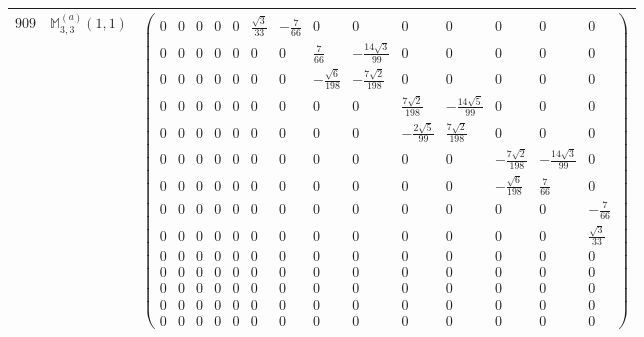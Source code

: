 \documentclass[fleqn,8pt,landscape]{jsarticle}
\begin{document}
\begin{center}
\begin{longtable}{ccc}
$ 909 $ & $ \mathbb{M}_{3,3}^{(a)}(1,1) $ & $ \begin{pmatrix} 0 & 0 & 0 & 0 & 0 & \frac{\sqrt{3}}{33} & - \frac{7}{66} & 0 & 0 & 0 & 0 & 0 & 0 & 0 \\ 0 & 0 & 0 & 0 & 0 & 0 & 0 & \frac{7}{66} & - \frac{14 \sqrt{3}}{99} & 0 & 0 & 0 & 0 & 0 \\ 0 & 0 & 0 & 0 & 0 & 0 & 0 & - \frac{\sqrt{6}}{198} & - \frac{7 \sqrt{2}}{198} & 0 & 0 & 0 & 0 & 0 \\ 0 & 0 & 0 & 0 & 0 & 0 & 0 & 0 & 0 & \frac{7 \sqrt{2}}{198} & - \frac{14 \sqrt{5}}{99} & 0 & 0 & 0 \\ 0 & 0 & 0 & 0 & 0 & 0 & 0 & 0 & 0 & - \frac{2 \sqrt{5}}{99} & \frac{7 \sqrt{2}}{198} & 0 & 0 & 0 \\ 0 & 0 & 0 & 0 & 0 & 0 & 0 & 0 & 0 & 0 & 0 & - \frac{7 \sqrt{2}}{198} & - \frac{14 \sqrt{3}}{99} & 0 \\ 0 & 0 & 0 & 0 & 0 & 0 & 0 & 0 & 0 & 0 & 0 & - \frac{\sqrt{6}}{198} & \frac{7}{66} & 0 \\ 0 & 0 & 0 & 0 & 0 & 0 & 0 & 0 & 0 & 0 & 0 & 0 & 0 & - \frac{7}{66} \\ 0 & 0 & 0 & 0 & 0 & 0 & 0 & 0 & 0 & 0 & 0 & 0 & 0 & \frac{\sqrt{3}}{33} \\ 0 & 0 & 0 & 0 & 0 & 0 & 0 & 0 & 0 & 0 & 0 & 0 & 0 & 0 \\ 0 & 0 & 0 & 0 & 0 & 0 & 0 & 0 & 0 & 0 & 0 & 0 & 0 & 0 \\ 0 & 0 & 0 & 0 & 0 & 0 & 0 & 0 & 0 & 0 & 0 & 0 & 0 & 0 \\ 0 & 0 & 0 & 0 & 0 & 0 & 0 & 0 & 0 & 0 & 0 & 0 & 0 & 0 \\ 0 & 0 & 0 & 0 & 0 & 0 & 0 & 0 & 0 & 0 & 0 & 0 & 0 & 0 \end{pmatrix} $ \\ \hline

\end{longtable}
\end{center}
\end{document}

